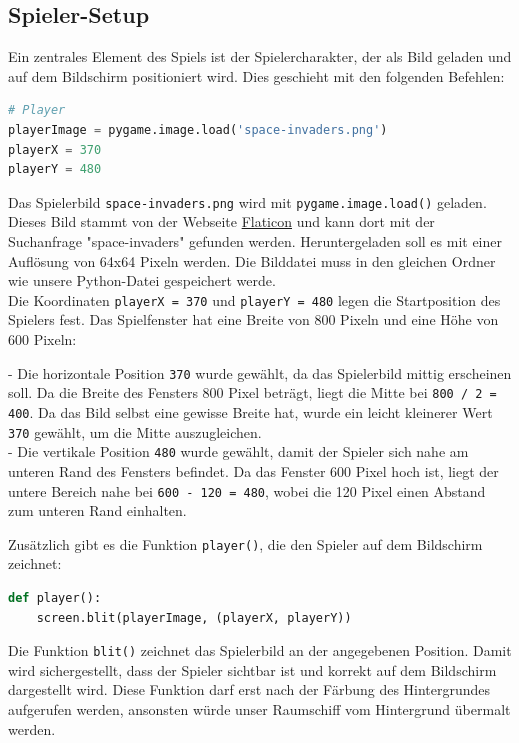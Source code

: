 \documentclass{article}
\begin{document}
\subsection{Spieler-Setup}
Ein zentrales Element des Spiels ist der Spielercharakter, der als Bild geladen und auf dem Bildschirm positioniert wird. Dies geschieht mit den folgenden Befehlen:

\begin{lstlisting}[style=pythonstyle, language=Python]
# Player
playerImage = pygame.image.load('space-invaders.png')
playerX = 370
playerY = 480
\end{lstlisting}

Das Spielerbild \texttt{space-invaders.png} wird mit \texttt{pygame.image.load()} geladen. Dieses Bild stammt von der Webseite \href{https://www.flaticon.com/}{Flaticon} und kann dort mit der Suchanfrage "space-invaders" gefunden werden. Heruntergeladen soll es mit einer Auflösung von 64x64 Pixeln werden. Die Bilddatei muss in den gleichen Ordner wie unsere Python-Datei gespeichert werde.\\

Die Koordinaten \texttt{playerX = 370} und \texttt{playerY = 480} legen die Startposition des Spielers fest. Das Spielfenster hat eine Breite von 800 Pixeln und eine Höhe von 600 Pixeln:

- Die horizontale Position \texttt{370} wurde gewählt, da das Spielerbild mittig erscheinen soll. Da die Breite des Fensters 800 Pixel beträgt, liegt die Mitte bei \texttt{800 / 2 = 400}. Da das Bild selbst eine gewisse Breite hat, wurde ein leicht kleinerer Wert \texttt{370} gewählt, um die Mitte auszugleichen.
\\ - Die vertikale Position \texttt{480} wurde gewählt, damit der Spieler sich nahe am unteren Rand des Fensters befindet. Da das Fenster 600 Pixel hoch ist, liegt der untere Bereich nahe bei \texttt{600 - 120 = 480}, wobei die 120 Pixel einen Abstand zum unteren Rand einhalten.

Zusätzlich gibt es die Funktion \texttt{player()}, die den Spieler auf dem Bildschirm zeichnet:

\begin{lstlisting}[style=pythonstyle, language=Python]
def player():
    screen.blit(playerImage, (playerX, playerY))
\end{lstlisting}

Die Funktion \texttt{blit()} zeichnet das Spielerbild an der angegebenen Position. Damit wird sichergestellt, dass der Spieler sichtbar ist und korrekt auf dem Bildschirm dargestellt wird. Diese Funktion darf erst nach der Färbung des Hintergrundes aufgerufen werden, ansonsten würde unser Raumschiff vom Hintergrund übermalt werden.
\end{document}
